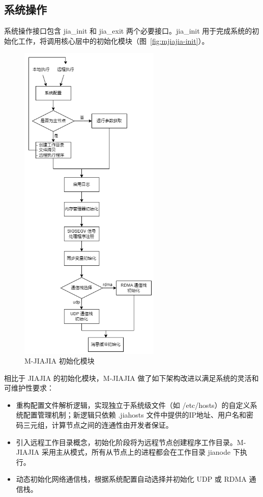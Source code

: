 {\subsection{系统操作}\label{sec:init}
系统操作接口包含 jia\_init 和 jia\_exit 两个必要接口。jia\_init 用于完成系统的初始化工作，将调用核心层中的初始化模块（图~\ref{fig:mjiajia-init}）。
\begin{figure}[!htbp]
    \centering
    \includegraphics[width=0.6\textwidth]{Img/M-JIAJIA-init.png}
    \caption{M-JIAJIA 初始化模块}
\end{figure}
相比于 JIAJIA 的初始化模块，M-JIAJIA 做了如下架构改进以满足系统的灵活和可维护性要求：
\begin{itemize}
    \item 重构配置文件解析逻辑，实现独立于系统级文件（如 /etc/hosts）的自定义系统配置管理机制；新逻辑只依赖 .jiahosts 文件中提供的IP地址、用户名和密码三元组，计算节点之间的连通性由开发者保证。
    \item 引入远程工作目录概念，初始化阶段将为远程节点创建程序工作目录。M-JIAJIA 采用主从模式，所有从节点上的进程都会在工作目录 jianode 下执行。
    \item 动态初始化网络通信栈，根据系统配置自动选择并初始化 UDP 或 RDMA 通信栈。
\end{itemize}

}
